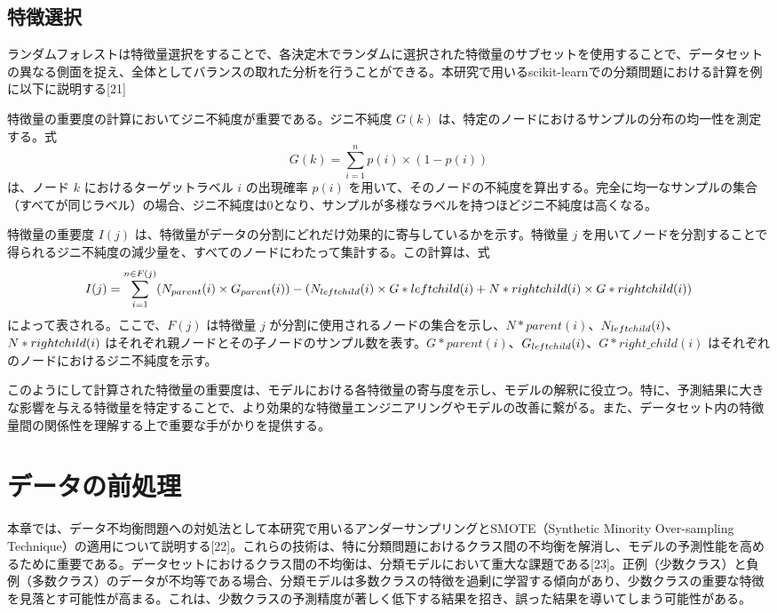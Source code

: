 \documentclass[platex]{suribt}
\begin{document}
\subsection{特徴選択}
ランダムフォレストは特徴量選択をすることで、各決定木でランダムに選択された特徴量のサブセットを使用することで、データセットの異なる側面を捉え、全体としてバランスの取れた分析を行うことができる。本研究で用いるscikit-learnでの分類問題における計算を例に以下に説明する[21]

特徴量の重要度の計算においてジニ不純度が重要である。ジニ不純度 \( G(k) \) は、特定のノードにおけるサンプルの分布の均一性を測定する。式
\begin{equation}
G(k) = \sum_{i=1}^{n} p(i) \times (1-p(i))
\end{equation}
は、ノード \( k \) におけるターゲットラベル \( i \) の出現確率 \( p(i) \) を用いて、そのノードの不純度を算出する。完全に均一なサンプルの集合（すべてが同じラベル）の場合、ジニ不純度は0となり、サンプルが多様なラベルを持つほどジニ不純度は高くなる。

特徴量の重要度 \( I(j) \) は、特徴量がデータの分割にどれだけ効果的に寄与しているかを示す。特徴量 \( j \) を用いてノードを分割することで得られるジニ不純度の減少量を、すべてのノードにわたって集計する。この計算は、式
\begin{equation}
I(j) = \sum_{i=1}^{n \in F(j)} (N_{parent}(i) \times G_{parent}(i)) - (N_{left\*child}(i) \times G*{left\*child}(i) + N*{right\*child}(i) \times G*{right\*child}(i))
\end{equation}
によって表される。ここで、\( F(j) \) は特徴量 \( j \) が分割に使用されるノードの集合を示し、\( N*{parent}(i) \)、\( N_{left\*child}(i) \)、\( N*{right\*child}(i) \) はそれぞれ親ノードとその子ノードのサンプル数を表す。\( G*{parent}(i) \)、\( G_{left\*child}(i) \)、\( G*{right\_child}(i) \) はそれぞれのノードにおけるジニ不純度を示す。

このようにして計算された特徴量の重要度は、モデルにおける各特徴量の寄与度を示し、モデルの解釈に役立つ。特に、予測結果に大きな影響を与える特徴量を特定することで、より効果的な特徴量エンジニアリングやモデルの改善に繋がる。また、データセット内の特徴量間の関係性を理解する上で重要な手がかりを提供する。
\section{データの前処理}
本章では、データ不均衡問題への対処法として本研究で用いるアンダーサンプリングとSMOTE（Synthetic Minority Over-sampling Technique）の適用について説明する[22]。これらの技術は、特に分類問題におけるクラス間の不均衡を解消し、モデルの予測性能を高めるために重要である。データセットにおけるクラス間の不均衡は、分類モデルにおいて重大な課題である[23]。正例（少数クラス）と負例（多数クラス）のデータが不均等である場合、分類モデルは多数クラスの特徴を過剰に学習する傾向があり、少数クラスの重要な特徴を見落とす可能性が高まる。これは、少数クラスの予測精度が著しく低下する結果を招き、誤った結果を導いてしまう可能性がある。
\end{document}
